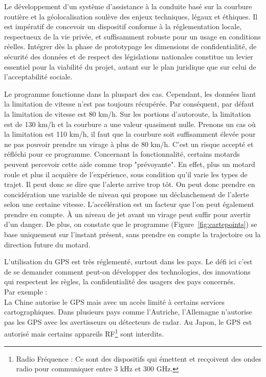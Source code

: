 \vspace{0.5cm}
Le développement d’un système d’assistance à la conduite basé sur la courbure routière et la géolocalisation soulève des enjeux techniques, légaux et éthiques. Il est impératif de concevoir un dispositif conforme à la réglementation locale, respectueux de la vie privée, et suffisamment robuste pour un usage en conditions réelles. Intégrer dès la phase de prototypage les dimensions de confidentialité, de sécurité des données et de respect des législations nationales constitue un levier essentiel pour la viabilité du projet, autant sur le plan juridique que sur celui de l’acceptabilité sociale.


Le programme fonctionne dans la pluspart des cas. Cependant, les données liant la limitation de vitesse n'est pas toujours récupérée. Par conséquent, par défaut la limitation de vitesse est 80 km/h. Sur les portions d'autoroute, la limitation est de 130 km/h et la courbure a une valeur quasiment nulle. Prenons un cas où la limitation est 110 km/h, il faut que la courbure soit suffisamment élevée pour ne pas pouvoir prendre un virage à plus de 80 km/h. C'est un risque accepté et réfléchi pour ce programme.
Concernant la fonctionnalité, certains motards peuvent percevoir cette aide comme trop "prévoyante". En effet, plus un motard roule et plus il acquière de l'expérience, sous condition qu'il varie les types de trajet. Il peut donc se dire que l'alerte arrive trop tôt. On peut donc prendre en concidération une variable de niveau qui propose un déclanchement de l'alerte selon une certaine vitesse. L'accélération est un facteur que l'on peut également prendre en compte. À un niveau de jet avant un virage peut suffir pour avertir d'un danger.
De plus, on constate que le programme (Figure~\ref{fig:cartepoints}) se base uniquement sur l’instant présent, sans prendre en compte la trajectoire ou la direction future du motard.



L'utilisation du GPS est très réglementé, surtout dans les pays. Le défi ici c'est de se demander comment peut-on développer des technologies, des innovations qui respectent les règles, la confidentialité des usagers des pays concernés.\\

Par exemple :\\
La Chine autorise le GPS mais avec un accès limité à certains services cartographiques. Dans plusieurs pays comme l'Autriche, l'Allemagne n'autorise pas les GPS avec les avertisseurs ou détecteurs de radar. Au Japon, le GPS est autorisé mais certains appareils RF\footnote{Radio Fréquence : Ce sont des dispositifs qui émettent et recçoivent des ondes radio pour communiquer entre 3 kHz et 300 GHz.} sont interdits.


